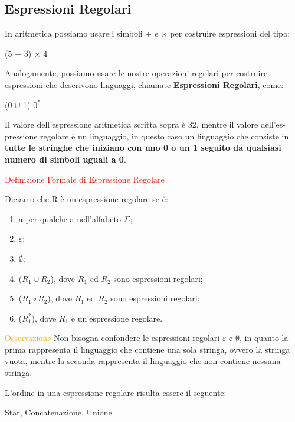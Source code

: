 \documentclass{article}
\begin{document}
\subsection{Espressioni Regolari}

In aritmetica possiamo usare i simboli + e $\times$ per costruire espressioni del tipo:

\begin{center}
    (5 + 3) $\times$ 4
\end{center}

Analogamente, possiamo usare le nostre operazioni regolari per costruire espressioni che descrivono linguaggi, chiamate \textbf{Espressioni Regolari}, come:

\begin{center}
    (0 $\cup$ 1) $0^*$
\end{center}

Il valore dell'espressione aritmetica scritta sopra è 32, mentre il valore dell'es-pressione regolare è un linguaggio, in questo caso un linguaggio che consiste in \textbf{tutte le stringhe che iniziano con uno 0 o un 1 seguito da qualsiasi numero di simboli uguali a 0}.

\textcolor{red}{Definizione Formale di Espressione Regolare}

\noindent Diciamo che R è un espressione regolare se è:
\begin{enumerate}
    \item a per qualche a nell'alfabeto $\Sigma$;
    \item $\varepsilon$;
    \item $\emptyset$;
    \item ($R_1 \cup R_2$), dove $R_1$ ed $R_2$ sono espressioni regolari;
    \item ($R_1 \circ R_2$), dove $R_1$ ed $R_2$ sono espressioni regolari;
    \item ($R_1^*$), dove $R_1$ è un'espressione regolare.
\end{enumerate}

\textcolor{orange}{Osservazione} Non bisogna confondere le espressioni regolari $\varepsilon$ e $\emptyset$, in quanto la prima rappresenta il linguaggio che contiene una sola stringa, ovvero la stringa vuota, mentre la seconda rappresenta il linguaggio che non contiene nessuna stringa.

\noindent L'ordine in una espressione regolare risulta essere il seguente:
\begin{center}
    Star, Concatenazione, Unione
\end{center}
\end{document}

